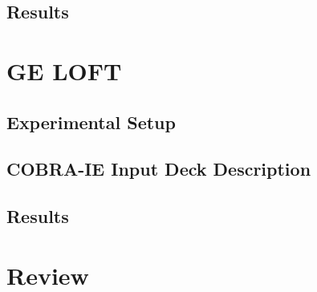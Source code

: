 \subsection{Results}

\section{GE LOFT}
\subsection{Experimental Setup}
\subsection{COBRA-IE Input Deck Description}
\subsection{Results}


\section{Review}
